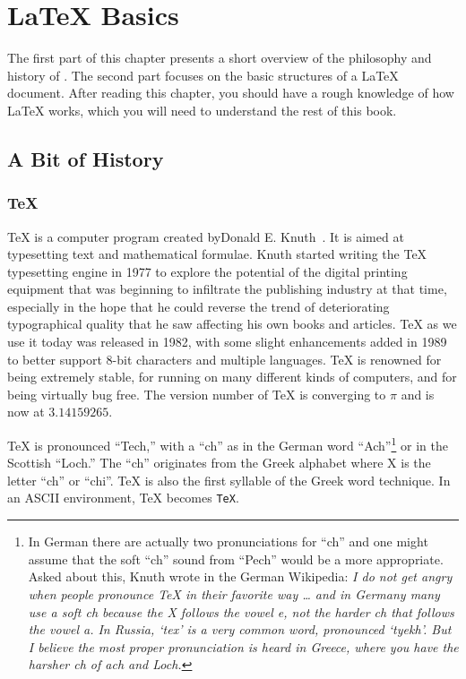 
\chapter{\LaTeX{} Basics}
\begin{intro}
  The first part of this chapter presents a short
  overview of the philosophy and history of \LaTeXe. The second part
  focuses on the basic structures of a \LaTeX{} document.
  After reading this chapter, you should have a rough knowledge
  of how \LaTeX{} works, which you will need to understand the rest
  of this book.
\end{intro}

\section{A Bit of History}
\subsection{\TeX}

\TeX{} is a computer program created byDonald
E. Knuth~\cite{texbook}. It is aimed at typesetting text and
mathematical formulae. Knuth started writing the \TeX{} typesetting
engine in 1977 to explore the potential of the digital printing
equipment that was beginning to infiltrate the publishing industry at
that time, especially in the hope that he could reverse the trend of
deteriorating typographical quality that he saw affecting his own
books and articles. \TeX{} as we use it today was released in 1982,
with some slight enhancements added in 1989 to better support 8-bit
characters and multiple languages. \TeX{} is renowned for being
extremely stable, for running on many different kinds of computers,
and for being virtually bug free. The version number of \TeX{} is
converging to $\pi$ and is now at $3.14159265$.


\TeX{} is pronounced ``Tech,'' with a ``ch'' as in the German word
``Ach''\footnote{In German there are actually two pronunciations for ``ch''
  and one might assume that the soft ``ch'' sound from ``Pech'' would be a
  more appropriate. Asked about this, Knuth wrote in the German Wikipedia:
  \emph{I do not get angry when people pronounce \TeX{} in their favorite way
    \ldots{} and in Germany many use a soft ch because the X follows the vowel
    e, not the harder ch that follows the vowel a. In Russia, `tex' is a very
    common word, pronounced `tyekh'. But I believe the most proper pronunciation
    is heard in Greece, where you have the harsher ch of ach and Loch.}}
or in the Scottish ``Loch.'' The ``ch'' originates from the Greek
alphabet where X is the letter ``ch'' or ``chi''. \TeX{} is also the first syllable
of the Greek word technique. In an ASCII environment, \TeX{}
becomes \texttt{TeX}.

